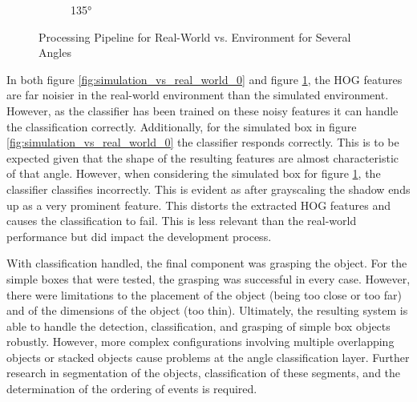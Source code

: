\documentclass[letterpaper, 10 pt, conference]{conf/ieeeconf}  %
\begin{document}
\begin{figure}[H]
\begin{subfigure}[b]{0.238\textwidth}
    \caption{\label{fig:simulation_vs_real_world_135}\ang{135}}
  \end{subfigure}
  \caption{\label{fig:pipelines} Processing Pipeline for Real-World vs.
    Environment for Several Angles}
\end{figure}

In both figure \ref{fig:simulation_vs_real_world_0} and figure
\ref{fig:simulation_vs_real_world_135}, the HOG features are far noisier in the
real-world environment than the simulated environment. However, as the
classifier has been trained on these noisy features it can handle the
classification correctly. Additionally, for the simulated box in figure
\ref{fig:simulation_vs_real_world_0} the classifier responds correctly. This is
to be expected given that the shape of the resulting features are almost
characteristic of that angle. However, when considering the simulated box for
figure \ref{fig:simulation_vs_real_world_135}, the classifier classifies
incorrectly. This is evident as after grayscaling the shadow ends up as a very
prominent feature. This distorts the extracted HOG features and causes the
classification to fail. This is less relevant than the real-world performance
but did impact the development process.

With classification handled, the final component was grasping the object. For
the simple boxes that were tested, the grasping was successful in every case.
However, there were limitations to the placement of the object (being too close
or too far) and of the dimensions of the object (too thin). Ultimately, the
resulting system is able to handle the detection, classification, and grasping
of simple box objects robustly. However, more complex configurations involving
multiple overlapping objects or stacked objects cause problems at the angle
classification layer. Further research in segmentation of the objects,
classification of these segments, and the determination of the ordering of
events is required.


\end{document}
